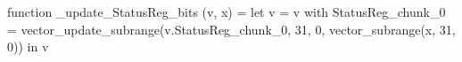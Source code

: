 function _update_StatusReg_bits (v, x) = let v = { v with StatusReg_chunk_0 = vector_update_subrange(v.StatusReg_chunk_0, 31, 0, vector_subrange(x, 31, 0)) } in v
